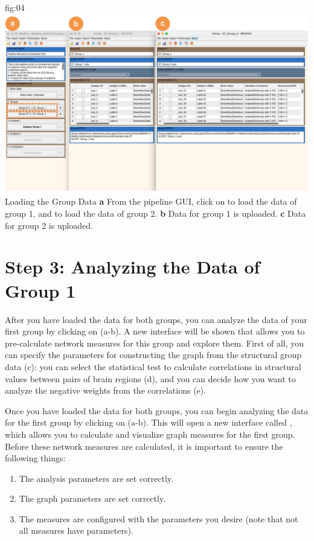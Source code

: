 \documentclass[justified]{tufte-handout}
\begin{document}
	{fig:04}
	{
	\includegraphics{fig04.jpg}
	}
	{Loading the Group Data}
	{
	{\bf a} From the pipeline GUI, click on  to load the data of group 1, and  to load the data of group 2.
	{\bf b} Data for group 1 is uploaded. {\bf c} Data for group 2 is uploaded.
	}

\section{Step 3: Analyzing the Data of Group 1}
 
After you have loaded the data for both groups, you can analyze the data of your first group by clicking on  (a-b). A new interface will be shown that allows you to pre-calculate network measures for this group and explore them. First of all, you can specify the parameters for constructing the graph from the structural group data (c): you can select the statistical test to calculate correlations in structural values between pairs of brain regions (d), and you can decide how you want to analyze the negative weights from the correlations (e). 

Once you have loaded the data for both groups, you can begin analyzing the data for the first group by clicking on  (a-b). 
This will open a new interface called , which allows you to calculate and visualize graph measures for the first group. 
Before these network measures are calculated, it is important to ensure the following things: 
\begin{enumerate}
	\item The analysis parameters are set correctly.
	\item The graph parameters are set correctly.
	\item The measures are configured with the parameters you desire (note that not all measures have parameters).
\end{enumerate}
\end{document}
